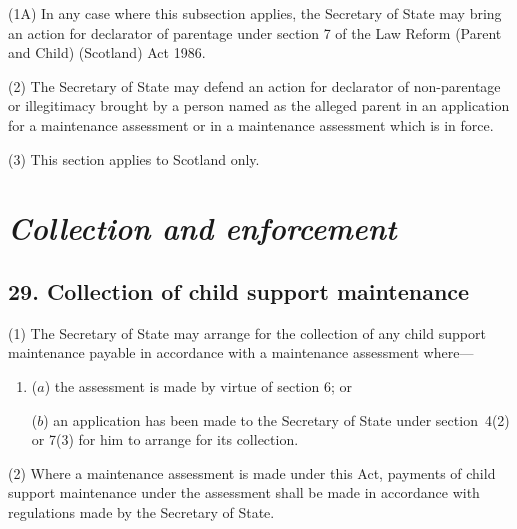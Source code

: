 \documentclass[12pt,a4paper]{article}
\begin{document}
(1A) In any case where this subsection applies, the Secretary of State may bring an action for declarator of parentage under section 7 of the Law Reform (Parent and Child) (Scotland) Act 1986.

(2) The Secretary of State may defend an action for declarator of non-parentage or illegitimacy brought by a person named as the alleged parent in an application for a maintenance assessment
or in a maintenance assessment which is in force.  %

(3) This section applies to Scotland only.


\section{\itshape Collection and enforcement}

\subsection{29. Collection of child support maintenance}

(1) The Secretary of State may arrange for the collection of any child support maintenance payable in accordance with a maintenance assessment where—
\begin{enumerate}\item[]
($a$) the assessment is made by virtue of section 6; or

($b$) an application has been made to the Secretary of State under section~4(2)  or 7(3)  for him to arrange for its collection.
\end{enumerate}

(2) Where a maintenance assessment is made under this Act, payments of child support maintenance under the assessment shall be made in accordance with regulations made by the Secretary of State.
\end{document}
